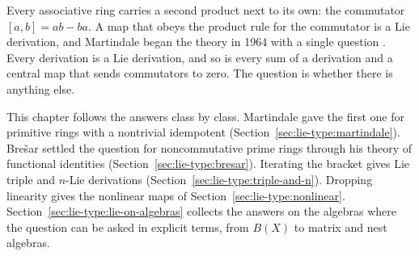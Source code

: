 Every associative ring carries a second product next to its own: the commutator
$[a,b]=ab-ba$. A map that obeys the product rule for the commutator is a Lie
derivation, and Martindale began the theory in 1964 with a single question
\cite[p.~183]{Martindale1964}. Every derivation is a Lie derivation, and so is
every sum of a derivation and a central map that sends commutators to zero. The
question is whether there is anything else.

This chapter follows the answers class by class. Martindale gave the first one
for primitive rings with a nontrivial idempotent
(Section~\ref{sec:lie-type:martindale}). Brešar settled the question for
noncommutative prime rings through his theory of functional identities
(Section~\ref{sec:lie-type:bresar}). Iterating the bracket gives Lie triple and
$n$-Lie derivations (Section~\ref{sec:lie-type:triple-and-n}). Dropping
linearity gives the nonlinear maps of
Section~\ref{sec:lie-type:nonlinear}. Section~\ref{sec:lie-type:lie-on-algebras}
collects the answers on the algebras where the question can be asked
in explicit terms, from $B(X)$ to matrix and nest algebras.

